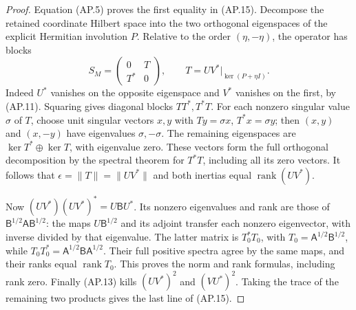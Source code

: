 \begin{proof}
Equation (AP.5) proves the first equality in (AP.15).  Decompose
the retained coordinate Hilbert space into the two orthogonal
eigenspaces of the explicit Hermitian involution \(P\).
Relative to the order \((\eta,-\eta)\), the operator has blocks
\[
 S_M=\begin{pmatrix}0&T\\T^*&0\end{pmatrix},
 \qquad T=UV^*|_{\ker(P+\eta I)}.
 \tag{AP.18}
\]
Indeed \(U^*\) vanishes on the opposite eigenspace and \(V^*\)
vanishes on the first, by (AP.11).  Squaring gives diagonal
blocks \(TT^*,T^*T\).  For each nonzero singular value
\(\sigma\) of \(T\), choose unit singular vectors
\(x,y\) with \(Ty=\sigma x\), \(T^*x=\sigma y\);
then \((x,y)\) and \((x,-y)\) have eigenvalues
\(\sigma,-\sigma\).  The remaining eigenspaces are
\(\ker T^*\oplus\ker T\), with eigenvalue zero.  These
vectors form the full orthogonal decomposition by the spectral
theorem for \(T^*T\), including all its zero vectors.
It follows that \(\epsilon=\|T\|=\|UV^*\|\) and both
inertias equal \(\operatorname{rank}(UV^*)\).

Now \((UV^*)(UV^*)^*=U\mathsf B U^*\).  Its nonzero
eigenvalues and rank are those of
\(\mathsf B^{1/2}\mathsf A\mathsf B^{1/2}\): the maps
\(U\mathsf B^{1/2}\) and its adjoint transfer each nonzero
eigenvector, with inverse divided by that eigenvalue.  The latter
matrix is \(T_0^*T_0\), with
\(T_0=\mathsf A^{1/2}\mathsf B^{1/2}\), while
\(T_0T_0^*=\mathsf A^{1/2}\mathsf B\mathsf A^{1/2}\).
Their full positive spectra agree by the same maps, and their
ranks equal \(\operatorname{rank}T_0\).  This proves the
norm and rank formulas, including rank zero.  Finally (AP.13)
kills \((UV^*)^2\) and \((VU^*)^2\).  Taking the trace of
the remaining two products gives the last line of (AP.15).


\end{proof}
